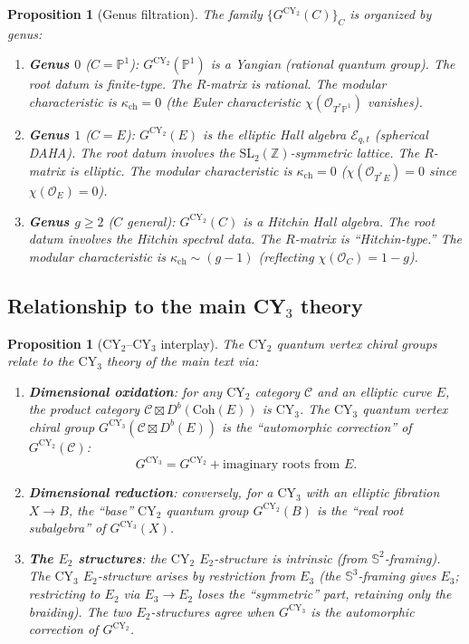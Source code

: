\documentclass[11pt]{article}
\theoremstyle{garamondthm}
\newtheorem{proposition}[theorem]{Proposition}
\theoremstyle{garamonddef}
\theoremstyle{garamondrem}
\newcommand{\Coh}{\mathrm{Coh}}
\newcommand{\CY}{\mathrm{CY}}
\newcommand{\Etwo}{E_2}
\newcommand{\cC}{\mathcal{C}}
\newcommand{\cE}{\mathcal{E}}
\newcommand{\cO}{\mathcal{O}}
\newcommand{\SL}{\mathrm{SL}}
\begin{document}
\begin{proposition}[Genus filtration]
\label{prop:genus-filtration}
The family $\{G^{\CY_2}(C)\}_{C}$ is organized by genus:
\begin{enumerate}[label=(\roman*)]
 \item \textbf{Genus $0$} ($C = \mathbb{P}^1$): $G^{\CY_2}(\mathbb{P}^1)$ is a Yangian (rational quantum group). The root datum is finite-type. The $R$-matrix is rational. The modular characteristic is $\kappa_{\mathrm{ch}} = 0$ (the Euler characteristic $\chi(\cO_{T^*\mathbb{P}^1})$ vanishes).
 \item \textbf{Genus $1$} ($C = E$): $G^{\CY_2}(E)$ is the elliptic Hall algebra $\cE_{q,t}$ (spherical DAHA). The root datum involves the $\SL_2(\mathbb{Z})$-symmetric lattice. The $R$-matrix is elliptic. The modular characteristic is $\kappa_{\mathrm{ch}} = 0$ ($\chi(\cO_{T^*E}) = 0$ since $\chi(\cO_E) = 0$).
 \item \textbf{Genus $g \geq 2$} ($C$ general): $G^{\CY_2}(C)$ is a Hitchin Hall algebra. The root datum involves the Hitchin spectral data. The $R$-matrix is ``Hitchin-type.'' The modular characteristic is $\kappa_{\mathrm{ch}} \sim (g-1)$ (reflecting $\chi(\cO_C) = 1 - g$).
\end{enumerate}
\end{proposition}

\subsection{Relationship to the main CY$_3$ theory}
\label{ssec:cy2-cy3}

\begin{proposition}[CY$_2$--CY$_3$ interplay]
\label{prop:cy2-cy3-interplay}
The $\CY_2$ quantum vertex chiral groups relate to the $\CY_3$ theory of the main text via:
\begin{enumerate}[label=(\roman*)]
 \item \textbf{Dimensional oxidation}: for any $\CY_2$ category $\cC$ and an elliptic curve $E$, the product category $\cC \boxtimes D^b(\Coh(E))$ is $\CY_3$. The $\CY_3$ quantum vertex chiral group $G^{\CY_3}(\cC \boxtimes D^b(E))$ is the ``automorphic correction'' of $G^{\CY_2}(\cC)$:
 \[
 G^{\CY_3} = G^{\CY_2} + \text{imaginary roots from } E.
 \]
 \item \textbf{Dimensional reduction}: conversely, for a $\CY_3$ with an elliptic fibration $X \to B$, the ``base'' $\CY_2$ quantum group $G^{\CY_2}(B)$ is the ``real root subalgebra'' of $G^{\CY_3}(X)$.
 \item \textbf{The $\Etwo$ structures}: the $\CY_2$ $\Etwo$-structure is \emph{intrinsic} (from $\mathbb{S}^2$-framing). The $\CY_3$ $\Etwo$-structure arises by restriction from $E_3$ (the $\mathbb{S}^3$-framing gives $E_3$; restricting to $\Etwo$ via $E_3 \to \Etwo$ loses the ``symmetric'' part, retaining only the braiding). The two $\Etwo$-structures agree when $G^{\CY_3}$ is the automorphic correction of $G^{\CY_2}$.
\end{enumerate}
\end{proposition}
\end{document}
